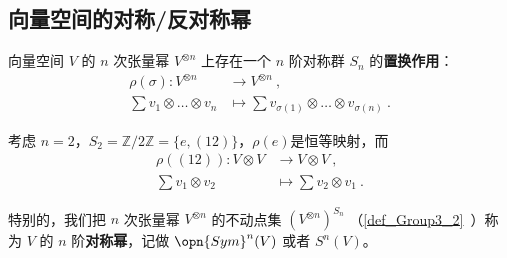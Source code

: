 

\subsection{向量空间的对称/反对称幂}

向量空间 $V$ 的 $n$ 次张量幂 $V^{\otimes n}$ 上存在一个 $n$ 阶对称群 $S_n$ 的\textbf{置换作用}：
\begin{equation}
\begin{aligned}
\rho(\sigma): V^{\otimes n} &\to V^{\otimes n}~, \\
\sum v_1 \otimes \dots \otimes v_n &\mapsto \sum v_{\sigma(1)} \otimes \dots \otimes v_{\sigma(n)}~.
\end{aligned}
\end{equation}


\begin{example}{}
考虑 $n = 2$，$S_2 = \mathbb{Z}/2\mathbb{Z} = \{e, (1 2)\}$，$\rho(e)$是恒等映射，而
\begin{equation}
\begin{aligned}
\rho((1 2)): V \otimes V &\to V \otimes V~, \\
\sum v_1 \otimes v_2 &\mapsto \sum v_2 \otimes v_1~.
\end{aligned}
\end{equation}
\end{example}

特别的，我们把 $n$ 次张量幂 $V^{\otimes n}$ 的不动点集 $(V^{\otimes n})^{S_n}$ （\autoref{def_Group3_2}~）称为 $V$ 的 $n$ 阶\textbf{对称幂}，记做 $\opn{Sym}^n(V)$ 或者 $S^n(V)$。

